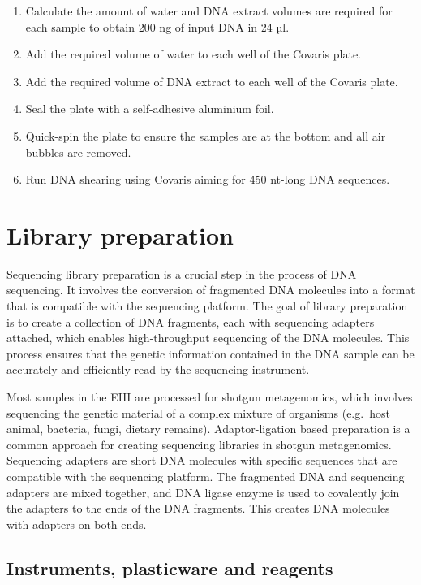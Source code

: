 \documentclass[
]{book}
\providecommand{\tightlist}{%
  \setlength{\itemsep}{0pt}\setlength{\parskip}{0pt}}
\begin{document}
\begin{enumerate}
\def\labelenumi{\arabic{enumi}.}
\tightlist
\item
  Calculate the amount of water and DNA extract volumes are required for each sample to obtain 200 ng of input DNA in 24 µl.
\item
  Add the required volume of water to each well of the Covaris plate.
\item
  Add the required volume of DNA extract to each well of the Covaris plate.
\item
  Seal the plate with a self-adhesive aluminium foil.
\item
  Quick-spin the plate to ensure the samples are at the bottom and all air bubbles are removed.
\item
  Run DNA shearing using Covaris aiming for 450 nt-long DNA sequences.
\end{enumerate}

\hypertarget{library-preparation}{%
\chapter{Library preparation}\label{library-preparation}}

Sequencing library preparation is a crucial step in the process of DNA sequencing. It involves the conversion of fragmented DNA molecules into a format that is compatible with the sequencing platform. The goal of library preparation is to create a collection of DNA fragments, each with sequencing adapters attached, which enables high-throughput sequencing of the DNA molecules. This process ensures that the genetic information contained in the DNA sample can be accurately and efficiently read by the sequencing instrument.

Most samples in the EHI are processed for shotgun metagenomics, which involves sequencing the genetic material of a complex mixture of organisms (e.g.~host animal, bacteria, fungi, dietary remains). Adaptor-ligation based preparation is a common approach for creating sequencing libraries in shotgun metagenomics. Sequencing adapters are short DNA molecules with specific sequences that are compatible with the sequencing platform. The fragmented DNA and sequencing adapters are mixed together, and DNA ligase enzyme is used to covalently join the adapters to the ends of the DNA fragments. This creates DNA molecules with adapters on both ends.

\hypertarget{instruments-plasticware-and-reagents-3}{%
\section{Instruments, plasticware and reagents}\label{instruments-plasticware-and-reagents-3}}
\end{document}

